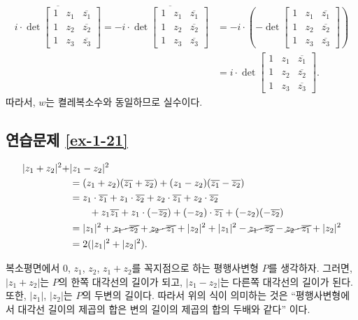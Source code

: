 \begin{align*}
\overline{i\cdot \det \begin{bmatrix}
1 & z_1 & \overline{z_1} \\
1 & z_2 & \overline{z_2} \\
1 & z_3 & \overline{z_3}
\end{bmatrix}}
= -i\cdot \overline{\det \begin{bmatrix}
1 & z_1 & \overline{z_1} \\
1 & z_2 & \overline{z_2} \\
1 & z_3 & \overline{z_3}
\end{bmatrix}}
& = -i \cdot \left(
-  \det \begin{bmatrix}
1 & z_1 & \overline{z_1} \\
1 & z_2 & \overline{z_2} \\
1 & z_3 & \overline{z_3}
\end{bmatrix}
\right) \\
& = i \cdot  \det \begin{bmatrix}
1 & z_1 & \overline{z_1} \\
1 & z_2 & \overline{z_2} \\
1 & z_3 & \overline{z_3}
\end{bmatrix}.
\end{align*}
따라서, $w$는 켤레복소수와 동일하므로 실수이다.

\subsection*{연습문제 \ref{ex-1-21}}

\begin{align*}
|z_1+z_2|^2 + & |z_1 - z_2|^2 \\
&= (z_1 + z_2)(\overline{z_1} + \overline{z_2}) + (z_1 - z_2)(\overline{z_1} - \overline{z_2}) \\
&= z_1\cdot \overline{z_1} + z_1 \cdot \overline{z_2} + z_2 \cdot \overline{z_1}
+ z_2\cdot \overline{z_2} \\
&\qquad + z_1\overline{z_1} + z_1\cdot(-\overline{z_2}) + (-z_2)\cdot\overline{z_1}
+ (-z_2)(-\overline{z_2}) \\
& = |z_1|^2 + \cancel{z_1 \cdot \overline{z_2}} + \cancel{z_2 \cdot \overline{z_1}}
+ |z_2|^2 + |z_1|^2 - \cancel{z_1 \cdot \overline{z_2}}  
- \cancel{z_2 \cdot \overline{z_1}} + |z_2|^2 \\
&= 2(|z_1|^2 + |z_2|^2).
\end{align*}

복소평면에서 $0$, $z_1$, $z_2$, $z_1+z_2$를 꼭지점으로 하는 평행사변형 $P$를 생각하자.
그러면, $|z_1+z_2|$는 $P$의 한쪽 대각선의 길이가 되고,
$|z_1-z_2|$는 다른쪽 대각선의 길이가 된다. 또한, $|z_1|$, $|z_2|$는
$P$의 두변의 길이다. 따라서 위의 식이 의미하는 것은
``평행사변형에서 대각선 길이의 제곱의 합은 변의 길이의 제곱의 합의 두배와 같다'' 이다.

